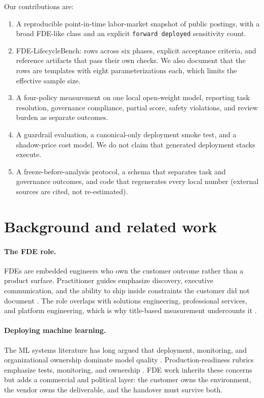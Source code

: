 \documentclass[11pt]{article}
\begin{document}
Our contributions are:
\begin{enumerate}
\item A reproducible point-in-time labor-market snapshot of \MarketPostings{} public postings, with a broad FDE-like class and an explicit \texttt{forward deployed} sensitivity count.
\item FDE-LifecycleBench: \TaskRows{} rows across six phases, explicit acceptance criteria, and reference artifacts that pass their own checks. We also document that the rows are \TaskTemplates{} templates with eight parameterizations each, which limits the effective sample size.
\item A four-policy measurement on one local open-weight model, reporting task resolution, governance compliance, partial score, safety violations, and review burden as separate outcomes.
\item A guardrail evaluation, a canonical-only deployment smoke test, and a shadow-price cost model. We do not claim that generated deployment stacks execute.
\item A freeze-before-analysis protocol, a schema that separates task and governance outcomes, and code that regenerates every local number (external sources are cited, not re-estimated).
\end{enumerate}

\section{Background and related work}
\paragraph{The FDE role.} FDEs are embedded engineers who own the customer outcome rather than a product surface. Practitioner guides emphasize discovery, executive communication, and the ability to ship inside constraints the customer did not document \citep{cio2026}. The role overlaps with solutions engineering, professional services, and platform engineering, which is why title-based measurement undercounts it \citep{fdejobs2026}.

\paragraph{Deploying machine learning.} The ML systems literature has long argued that deployment, monitoring, and organizational ownership dominate model quality \citep{sculley2015,paleyes2022}. Production-readiness rubrics emphasize tests, monitoring, and ownership \citep{breck2017}. FDE work inherits these concerns but adds a commercial and political layer: the customer owns the environment, the vendor owns the deliverable, and the handover must survive both.
\end{document}
